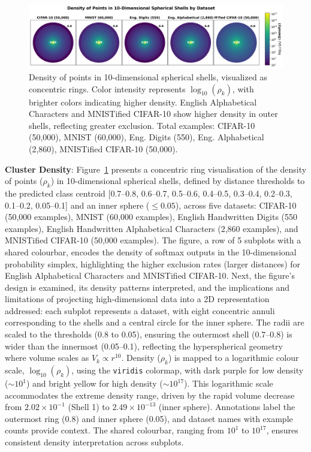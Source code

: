 \begin{figure}[ht]
    \centering
\includegraphics[width=0.99\columnwidth]{Figures/density_rings.png}
\caption{Density of points in 10-dimensional spherical shells, visualized as concentric rings. Color intensity represents $\log_{10}(\rho_k)$, with brighter colors indicating higher density. English Alphabetical Characters and MNISTified CIFAR-10 show higher density in outer shells, reflecting greater exclusion. Total examples: CIFAR-10 (50,000), MNIST (60,000), Eng. Digits (550), Eng. Alphabetical (2,860), MNISTified CIFAR-10 (50,000).}
\label{fig:density_rings}
\end{figure}

\textbf{Cluster Density}: Figure~\ref{fig:density_rings} presents a concentric ring visualisation of the density of points (\(\rho_k\)) in 10-dimensional spherical shells, defined by distance thresholds to the predicted class centroid [0.7--0.8, 0.6--0.7, 0.5--0.6, 0.4--0.5, 0.3--0.4, 0.2--0.3, 0.1--0.2, 0.05--0.1] and an inner sphere (\(\leq 0.05\)), across five datasets: CIFAR-10 (50,000 examples), MNIST (60,000 examples), English Handwritten Digits (550 examples), English Handwritten Alphabetical Characters (2,860 examples), and MNISTified CIFAR-10 (50,000 examples). The figure, a row of 5 subplots with a shared colourbar, encodes the density of softmax outputs in the 10-dimensional probability simplex, highlighting the higher exclusion rates (larger distances) for English Alphabetical Characters and MNISTified CIFAR-10. Next, the figure’s design is examined, its density patterns interpreted, and the implications and limitations of projecting high-dimensional data into a 2D representation addressed: each subplot represents a dataset, with eight concentric annuli corresponding to the shells and a central circle for the inner sphere. The radii are scaled to the thresholds (0.8 to 0.05), ensuring the outermost shell (0.7--0.8) is wider than the innermost (0.05--0.1), reflecting the hyperspherical geometry where volume scales as \(V_k \propto r^{10}\). Density (\(\rho_k\)) is mapped to a logarithmic colour scale, \(\log_{10}(\rho_k)\), using the \texttt{viridis} colormap, with dark purple for low density (\(\sim 10^1\)) and bright yellow for high density (\(\sim 10^{17}\)). This logarithmic scale accommodates the extreme density range, driven by the rapid volume decrease from \(2.02 \times 10^{-1}\) (Shell 1) to \(2.49 \times 10^{-13}\) (inner sphere). Annotations label the outermost ring (0.8) and inner sphere (0.05), and dataset names with example counts provide context. The shared colourbar, ranging from \(10^1\) to \(10^{17}\), ensures consistent density interpretation across subplots.

